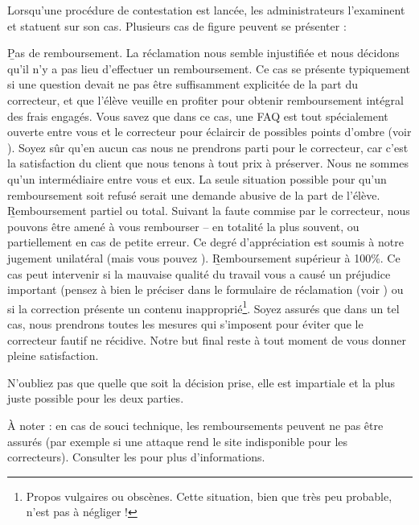 ﻿Lorsqu'une procédure de contestation est lancée, les administrateurs l'examinent et statuent sur son cas. Plusieurs cas de figure peuvent se présenter :

\begin{itemize}
\li \b{Pas de remboursement.} La réclamation nous semble injustifiée et nous décidons qu'il n'y a pas lieu d'effectuer un remboursement. Ce cas se présente typiquement si une question devait ne pas être suffisamment explicitée de la part du correcteur, et que l'élève veuille en profiter pour obtenir remboursement intégral des frais engagés. Vous savez que dans ce cas, une FAQ est tout spécialement ouverte entre vous et le correcteur pour éclaircir de possibles points d'ombre (voir ). Soyez sûr qu'en aucun cas nous ne prendrons parti pour le correcteur, car c'est la satisfaction du client que nous tenons à tout prix à préserver. Nous ne sommes qu'un intermédiaire entre vous et eux. La seule situation possible pour qu'un remboursement soit refusé serait une demande abusive de la part de l'élève.
\li \b{Remboursement partiel ou total.} Suivant la faute commise par le correcteur, nous pouvons être amené à vous rembourser -- en totalité la plus souvent, ou partiellement en cas de petite erreur. Ce degré d'appréciation est soumis à notre jugement unilatéral (mais vous pouvez ).
\li \b{Remboursement supérieur à 100\%.} Ce cas peut intervenir si la mauvaise qualité du travail vous a causé un préjudice important (pensez à bien le préciser dans le formulaire de réclamation (voir ) ou si la correction présente un contenu inapproprié\footnote{Propos vulgaires ou obscènes. Cette situation, bien que très peu probable, n'est pas à négliger !}. Soyez assurés que dans un tel cas, nous prendrons toutes les mesures qui s'imposent pour éviter que le correcteur fautif ne récidive. Notre but final reste à tout moment de vous donner pleine satisfaction.
\end{itemize}

N'oubliez pas que quelle que soit la décision prise, elle est impartiale et la plus juste possible pour les deux parties.

À noter : en cas de souci technique, les remboursements peuvent ne pas être assurés (par exemple si une attaque rend le site indisponible pour les correcteurs). Consulter les  pour plus d'informations.